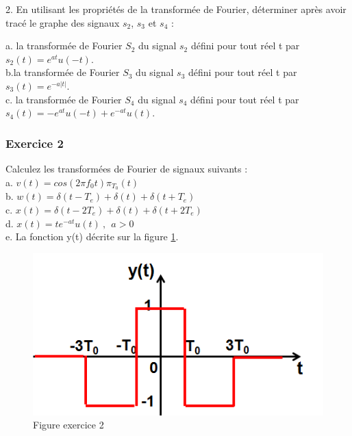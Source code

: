 	2. En utilisant les propriétés de la transformée de Fourier, déterminer après avoir tracé le graphe des signaux $s_2$, $s_3$ et $s_4$ :
	
	a. la transformée de Fourier $S_2$ du signal $s_2$ défini pour tout réel t par $s_2(t)=e^{at}u(-t)$.\\
	
	b.la transformée de Fourier $S_3$ du signal $s_3$ défini pour tout réel t par $s_3(t)=e^{-a|t|}$.\\
	
	c. la transformée de Fourier $S_4$ du signal $s_4$ défini pour tout réel t par $s_4(t)=-e^{at}u(-t)+e^{-at}u(t)$.\\
	
	\subsubsection{Exercice 2}
	
	Calculez les transformées de Fourier de signaux suivants :\\
	
	a. $v(t) = cos(2\pi f_0 t)\pi_{T_0}(t)$\\
	
	b. $w(t) = \delta(t-T_e)+\delta(t)+\delta(t+T_e)$\\
	
	c. $x(t) = \delta(t-2T_e)+\delta(t)+\delta(t+2T_e)$\\
	
	d. $x(t) = te^{-at}u(t)~,~~a>0$\\
	
	e. La fonction y(t) décrite sur la figure \ref{Fig:Exo_TF_2}.
	
	\begin{figure}[h!]
		\centering
		\includegraphics[scale=0.5]{images/exo_2_TF.png}
		\caption{Figure exercice 2}	
		\label{Fig:Exo_TF_2} 
	\end{figure}
	
